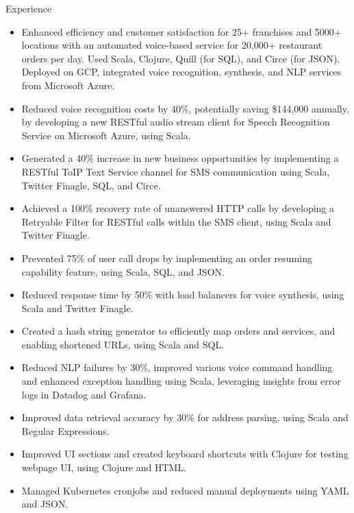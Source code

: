 \documentclass{resume} %
\begin{document}
\begin{workSection}{Experience}
    \experienceItem[
    company=Novo Labs Inc,
    location=Dallas{,} TX,
    position=Software Engineer,
    duration=Feb 2021 – Jun 2023
    ]
    \vspace{-0.65em}
    \begin{itemize}
        \itemsep -6pt {}
        \item Enhanced efficiency and customer satisfaction for 25+ franchises
              and 5000+ locations with an automated voice-based service for
              20,000+
              restaurant orders per day. Used Scala, Clojure, Quill (for SQL),
              and Circe (for
              JSON). Deployed on GCP, integrated voice recognition, synthesis,
              and NLP
              services from Microsoft Azure.
        \item Reduced voice recognition costs by 40\%, potentially saving
              \$144,000 annually, by developing a new RESTful audio stream
              client for Speech
              Recognition Service on Microsoft Azure, using Scala.
        \item Generated a 40\% increase in new business opportunities by
              implementing a RESTful ToIP Text Service channel for SMS
              communication using
              Scala, Twitter Finagle, SQL, and Circe.
        \item Achieved a 100\% recovery rate of unanswered HTTP calls by
              developing a Retryable Filter for RESTful calls within the SMS
              client, using
              Scala and Twitter Finagle.
        \item Prevented 75\% of user call drops by implementing an order
              resuming capability feature, using Scala, SQL, and JSON.
        \item Reduced response time by 50\% with load
              balancers for voice synthesis, using Scala and Twitter Finagle.
        \item Created a hash string generator to efficiently map orders and
              services, and enabling shortened URLs, using Scala and
              SQL.
        \item Reduced NLP failures by 30\%, improved various voice command
              handling and enhanced exception handling using Scala, leveraging
              insights from
              error logs in Datadog and Grafana.
        \item Improved data retrieval accuracy by 30\% for address parsing,
              using Scala and Regular
              Expressions.
        \item Improved UI sections and created keyboard shortcuts with Clojure
              for testing webpage UI, using Clojure and HTML.
        \item Managed Kubernetes cronjobs and reduced manual deployments using
              YAML and JSON.
    \end{itemize}


\end{workSection}
\end{document}
